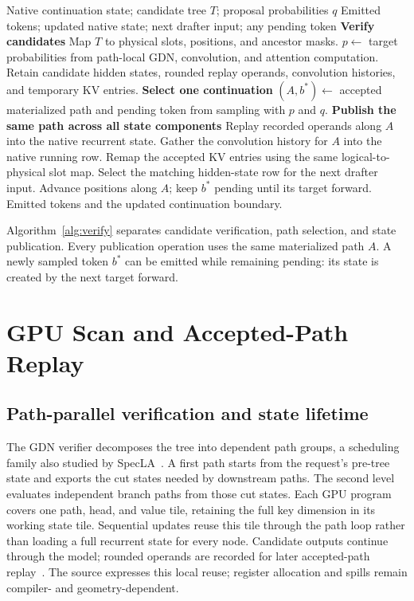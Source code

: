 \documentclass[conference]{IEEEtran}
\begin{document}
\begin{algorithm*}[t]
\caption{Tree verification and native continuation}
\label{alg:verify}
\normalsize\linespread{1.08}\selectfont\raggedright
\begin{algorithmic}[1]
\Require Native continuation state; candidate tree $T$; proposal probabilities $q$
\Ensure Emitted tokens; updated native state; next drafter input; any pending token
\Statex \textbf{Verify candidates}
\State Map $T$ to physical slots, positions, and ancestor masks.
\State $p\gets$ target probabilities from path-local GDN, convolution, and attention computation.
\State Retain candidate hidden states, rounded replay operands, convolution histories, and temporary KV entries.
\Statex \textbf{Select one continuation}
\State $(A,b^*)\gets$ accepted materialized path and pending token from sampling with $p$ and $q$.
\Statex \textbf{Publish the same path across all state components}
  \State Replay recorded operands along $A$ into the native recurrent state.
  \State Gather the convolution history for $A$ into the native running row.
\EndFor
\State Remap the accepted KV entries using the same logical-to-physical slot map.
\State Select the matching hidden-state row for the next drafter input.
\State Advance positions along $A$; keep $b^*$ pending until its target forward.
\State \Return Emitted tokens and the updated continuation boundary.
\end{algorithmic}
\end{algorithm*}

Algorithm~\ref{alg:verify} separates candidate verification, path selection, and state publication. Every publication operation uses the same materialized path $A$. A newly sampled token $b^*$ can be emitted while remaining pending: its state is created by the next target forward.

\section{GPU Scan and Accepted-Path Replay}
\label{sec:kernel}
\subsection{Path-parallel verification and state lifetime}
The GDN verifier decomposes the tree into dependent path groups, a scheduling family also studied by SpecLA~\cite{wang2026specla}. A first path starts from the request's pre-tree state and exports the cut states needed by downstream paths. The second level evaluates independent branch paths from those cut states. Each GPU program covers one path, head, and value tile, retaining the full key dimension in its working state tile. Sequential updates reuse this tile through the path loop rather than loading a full recurrent state for every node. Candidate outputs continue through the model; rounded operands are recorded for later accepted-path replay~\cite{lumo2026archive}. The source expresses this local reuse; register allocation and spills remain compiler- and geometry-dependent.
\end{document}
